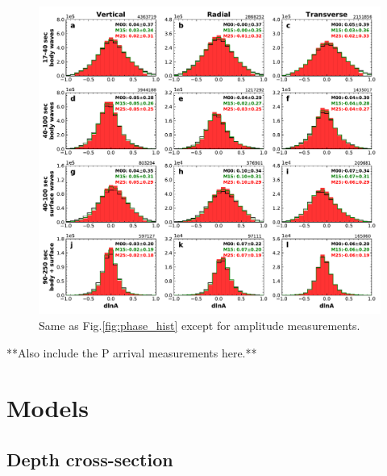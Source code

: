 \documentclass[extra,mreferee]{gji}
\begin{document}
\begin{figure}
  \centering
  \includegraphics[width=\textwidth]{figures/dlna_histogram.pdf}
  \caption{Same as Fig.\ref{fig:phase_hist} except for amplitude measurements.}
\end{figure}


**Also include the P arrival measurements here.**

\section{Models}

\subsection{Depth cross-section}
\end{document}
